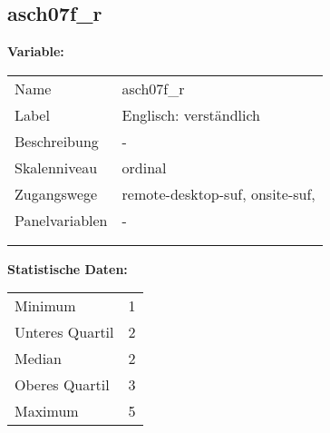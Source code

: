 	
	
	\subsection{asch07f\_r}
	\label{subSection:asch07f_r}

	\noindent\textbf{Variable:}\\
		\begin{tabular}{lL{11.3cm}}
			\label{tableVariable:asch07f_r}
			Name & asch07f\_r \\
			Label & Englisch: verständlich \\
			Beschreibung & - \\
			Skalenniveau & ordinal \\
			Zugangswege &
				remote-desktop-suf,
				onsite-suf,
 \\
			Panelvariablen & -
			 \\
			 \\
 \\
		\end{tabular}



		\vspace*{1 cm}
		\noindent\textbf{Statistische Daten:}\\
			\begin{tabular}{ll}
				\label{tableStatistics:asch07f_r}
					Minimum & 1 \\
					Unteres Quartil & 2 \\
					Median & 2 \\
					Oberes Quartil & 3 \\
					Maximum & 5 \\
			\end{tabular}



